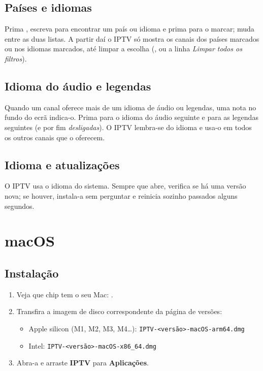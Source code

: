 \subsection{Países e idiomas}
Prima , escreva para encontrar um país ou idioma e prima 
para o marcar;  muda entre as duas listas. A partir daí o IPTV só
mostra os canais dos países marcados ou nos idiomas marcados, até limpar a
escolha (, ou a linha \emph{Limpar todos os filtros}).

\subsection{Idioma do áudio e legendas}
Quando um canal oferece mais de um idioma de áudio ou legendas, uma nota no
fundo do ecrã indica-o. Prima  para o idioma do áudio seguinte e
 para as legendas seguintes (e por fim \emph{desligadas}). O IPTV
lembra-se do idioma e usa-o em todos os outros canais que o oferecem.

\subsection{Idioma e atualizações}
O IPTV usa o idioma do sistema. Sempre que abre, verifica se há uma versão
nova; se houver, instala-a sem perguntar e reinicia sozinho passados alguns
segundos.

\section{macOS}

\subsection{Instalação}
\begin{enumerate}
  \item Veja que chip tem o seu Mac: .
  \item Transfira a imagem de disco correspondente da página de versões:
  \begin{itemize}
    \item Apple silicon (M1, M2, M3, M4\ldots):
          \texttt{IPTV-\textless versão\textgreater-macOS-arm64.dmg}
    \item Intel: \texttt{IPTV-\textless versão\textgreater-macOS-x86\_64.dmg}
  \end{itemize}
  \item Abra-a e arraste \textbf{IPTV} para \textbf{Aplicações}.
\end{enumerate}

